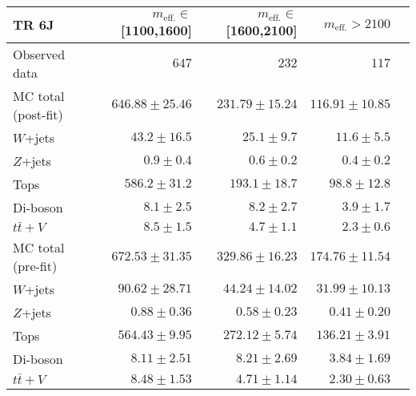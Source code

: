 \begin{table}
\begin{center}
\begin{tabular*}{\textwidth}{@{\extracolsep{\fill}}lrrrr}
\toprule
\textbf{TR 6J} &  $m_{\mathrm{eff.}}\in$[1100,1600] & $m_{\mathrm{eff.}}\in$[1600,2100] & $m_{\mathrm{eff.}}>2100$ \\
\midrule

Observed data          & $647$              & $232$              & $117$                    \\
\midrule
\midrule
MC total (post-fit)         & $646.88 \pm 25.46$          & $231.79 \pm 15.24$          & $116.91 \pm 10.85$              \\
\midrule
        $W$+jets         & $43.2 \pm 16.5$          & $25.1 \pm 9.7$          & $11.6 \pm 5.5$              \\
        $Z$+jets         & $0.9 \pm 0.4$          & $0.6 \pm 0.2$          & $0.4 \pm 0.2$              \\
        Tops         & $586.2 \pm 31.2$          & $193.1 \pm 18.7$          & $98.8 \pm 12.8$              \\
        Di-boson         & $8.1 \pm 2.5$          & $8.2 \pm 2.7$          & $3.9 \pm 1.7$              \\
        $t\bar{t}+V$         & $8.5 \pm 1.5$          & $4.7 \pm 1.1$          & $2.3 \pm 0.6$              \\
\midrule
\midrule
MC total (pre-fit)              & $672.53 \pm 31.35$          & $329.86 \pm 16.23$          & $174.76 \pm 11.54$              \\
\midrule
        $W$+jets         & $90.62 \pm 28.71$          & $44.24 \pm 14.02$          & $31.99 \pm 10.13$              \\
        $Z$+jets         & $0.88 \pm 0.36$          & $0.58 \pm 0.23$          & $0.41 \pm 0.20$              \\
        Tops         & $564.43 \pm 9.95$          & $272.12 \pm 5.74$          & $136.21 \pm 3.91$              \\
        Di-boson         & $8.11 \pm 2.51$          & $8.21 \pm 2.69$          & $3.84 \pm 1.69$              \\
        $t\bar{t}+V$         & $8.48 \pm 1.53$          & $4.71 \pm 1.14$          & $2.30 \pm 0.63$              \\
    \bottomrule
    \end{tabular*}
    
  \end{center}
\end{table}


